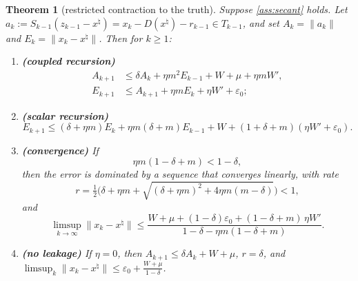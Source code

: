 \documentclass[11pt]{article}
\newtheorem{theorem}{Theorem}[section]
\theoremstyle{definition}
\theoremstyle{remark}
\newcommand{\norm}[1]{\lVert #1\rVert}
\newcommand{\xt}{x^\natural}
\begin{document}
\begin{theorem}[restricted contraction to the truth]\label{thm:restricted}
Suppose \cref{ass:secant} holds. Let $a_k:=S_{k-1}(z_{k-1}-\xt)=x_k-D(\xt)-r_{k-1}\in T_{k-1}$, and set
$A_k=\norm{a_k}$ and $E_k=\norm{x_k-\xt}$. Then for $k\geq1$:
\begin{enumerate}
\item \textbf{(coupled recursion)}
  \begin{align}
    A_{k+1}&\leq\delta A_k+\eta m^2E_{k-1}+W+\mu+\eta mW',\label{eq:recA}\\
    E_{k+1}&\leq A_{k+1}+\eta mE_k+\eta W'+\varepsilon_0;\label{eq:recE}
  \end{align}
\item \textbf{(scalar recursion)}
  \begin{equation}\label{eq:recscalar}
    E_{k+1}\leq(\delta+\eta m)E_k+\eta m(\delta+m)E_{k-1}+W+(1+\delta+m)(\eta W'+\varepsilon_0).
  \end{equation}
\item \textbf{(convergence)} If
  \begin{equation}\label{eq:condition}
  \eta m(1-\delta+m)<1-\delta,
  \end{equation}
  then the error is dominated by a sequence that converges linearly, with rate
  \[
  r=\tfrac12\Big(\delta+\eta m+\sqrt{(\delta+\eta m)^2+4\eta m(m-\delta)}\Big)<1,
  \]
  and
  \begin{equation}\label{eq:limsup}
    \limsup_{k\to\infty}\norm{x_k-\xt}\leq\frac{W+\mu+(1-\delta)\varepsilon_0+(1-\delta+m)\,\eta W'}{1-\delta-\eta m(1-\delta+m)} .
  \end{equation}
\item \textbf{(no leakage)} If $\eta=0$, then $A_{k+1}\leq\delta A_k+W+\mu$, $r=\delta$, and
  $\limsup_k\norm{x_k-\xt}\leq\varepsilon_0+\frac{W+\mu}{1-\delta}$.
\end{enumerate}
\end{theorem}
\end{document}
